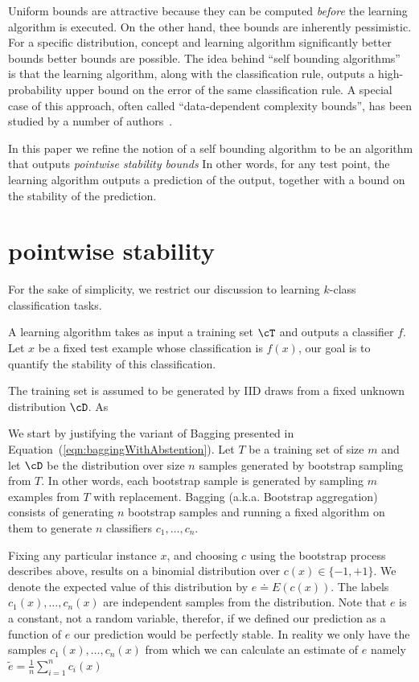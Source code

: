Uniform bounds are attractive because they can be computed {\em
  before} the learning algorithm is executed. On
the other hand, thee bounds are inherently pessimistic. For a specific
distribution, concept and learning algorithm significantly better
bounds better bounds are possible. The idea behind ``self bounding
algorithms''~\cite{freund1998self} is that the learning algorithm,
along with the classification rule, outputs a high-probability upper
bound on the error of the same classification rule. A special case of this approach,
often called ``data-dependent complexity bounds'', has been studied by
a number of authors~\cite{}.

In this paper we refine the notion of a self bounding
algorithm to be an algorithm that outputs {\em pointwise stability
bounds} In other words, for any test point, the learning algorithm
outputs a prediction of the output, together with a bound on the
stability of the prediction. 

\section{pointwise stability}

For the sake of simplicity, we restrict our discussion to learning
$k$-class classification tasks.

A learning algorithm takes as input a training set $\cT$ and 
outputs a classifier $f$. Let $x$ be a fixed test example whose
classification is $f(x)$, our goal is to quantify the stability of
this classification.

The training set is assumed to be generated by IID draws from a fixed
unknown distribution $\cD$.  As 


We start by justifying the variant of Bagging presented in
Equation~(\ref{eqn:baggingWithAbstention}). Let $T$ be a training set
of size $m$ and let $\cD$ be the distribution over size $n$ samples
generated by bootstrap sampling from $T$. In other words, each
bootstrap sample is generated by sampling $m$ examples from $T$ with
replacement. Bagging (a.k.a. Bootstrap aggregation) consists of
generating $n$ bootstrap samples and running a fixed algorithm on them
to generate $n$ classifiers $c_1,\ldots,c_n$.

\newcommand{\te}{\tilde{e}}

Fixing any particular instance $x$, and choosing $c$ using the
bootstrap process describes above, results on a binomial distribution
over $c(x) \in \{-1,+1\}$. We denote the expected value of this distribution
by $e \doteq E\left( c(x) \right)$. The labels
$c_1(x),\ldots,c_n(x)$ are independent samples from the distribution.
Note that $e$ is a constant, not a random variable, therefor, if we
defined our prediction as a function of $e$ our prediction would be
perfectly stable. In reality we only
have the samples $c_1(x),\ldots,c_n(x)$ from which we can calculate
an estimate of $e$ namely $\te = \frac{1}{n} \sum_{i=1}^n c_i(x)$

